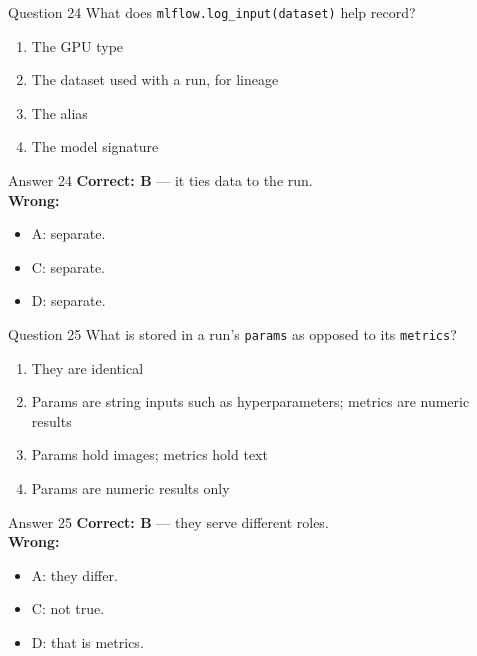 \documentclass[aspectratio=169,11pt]{beamer}
\begin{document}
\begin{frame}{Question 24}
What does \texttt{mlflow.log\_input(dataset)} help record?
\begin{enumerate}[label=\Alph*.]
\item The GPU type
\item The dataset used with a run, for lineage
\item The alias
\item The model signature
\end{enumerate}
\end{frame}
\begin{frame}{Answer 24}
\textbf{Correct: B} --- it ties data to the run.\\
\vspace{0.5em}
\textbf{Wrong:}
\begin{itemize}
\item A: separate.
\item C: separate.
\item D: separate.
\end{itemize}
\end{frame}

\begin{frame}{Question 25}
What is stored in a run's \texttt{params} as opposed to its \texttt{metrics}?
\begin{enumerate}[label=\Alph*.]
\item They are identical
\item Params are string inputs such as hyperparameters; metrics are numeric results
\item Params hold images; metrics hold text
\item Params are numeric results only
\end{enumerate}
\end{frame}
\begin{frame}{Answer 25}
\textbf{Correct: B} --- they serve different roles.\\
\vspace{0.5em}
\textbf{Wrong:}
\begin{itemize}
\item A: they differ.
\item C: not true.
\item D: that is metrics.
\end{itemize}
\end{frame}
\end{document}
